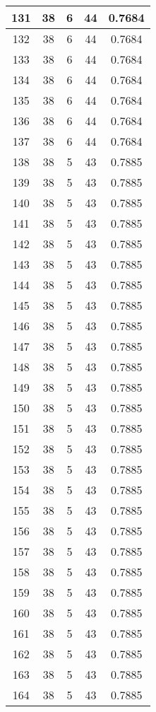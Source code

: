 \documentclass[letterpaper, 12pt]{article}
\begin{document}
\begin{longtable}{|c|c|c|c|c|}
\hline
131 & 38 & 6 & 44 & 0.7684 \\
\hline
132 & 38 & 6 & 44 & 0.7684 \\
\hline
133 & 38 & 6 & 44 & 0.7684 \\
\hline
134 & 38 & 6 & 44 & 0.7684 \\
\hline
135 & 38 & 6 & 44 & 0.7684 \\
\hline
136 & 38 & 6 & 44 & 0.7684 \\
\hline
137 & 38 & 6 & 44 & 0.7684 \\
\hline
138 & 38 & 5 & 43 & 0.7885 \\
\hline
139 & 38 & 5 & 43 & 0.7885 \\
\hline
140 & 38 & 5 & 43 & 0.7885 \\
\hline
141 & 38 & 5 & 43 & 0.7885 \\
\hline
142 & 38 & 5 & 43 & 0.7885 \\
\hline
143 & 38 & 5 & 43 & 0.7885 \\
\hline
144 & 38 & 5 & 43 & 0.7885 \\
\hline
145 & 38 & 5 & 43 & 0.7885 \\
\hline
146 & 38 & 5 & 43 & 0.7885 \\
\hline
147 & 38 & 5 & 43 & 0.7885 \\
\hline
148 & 38 & 5 & 43 & 0.7885 \\
\hline
149 & 38 & 5 & 43 & 0.7885 \\
\hline
150 & 38 & 5 & 43 & 0.7885 \\
\hline
151 & 38 & 5 & 43 & 0.7885 \\
\hline
152 & 38 & 5 & 43 & 0.7885 \\
\hline
153 & 38 & 5 & 43 & 0.7885 \\
\hline
154 & 38 & 5 & 43 & 0.7885 \\
\hline
155 & 38 & 5 & 43 & 0.7885 \\
\hline
156 & 38 & 5 & 43 & 0.7885 \\
\hline
157 & 38 & 5 & 43 & 0.7885 \\
\hline
158 & 38 & 5 & 43 & 0.7885 \\
\hline
159 & 38 & 5 & 43 & 0.7885 \\
\hline
160 & 38 & 5 & 43 & 0.7885 \\
\hline
161 & 38 & 5 & 43 & 0.7885 \\
\hline
162 & 38 & 5 & 43 & 0.7885 \\
\hline
163 & 38 & 5 & 43 & 0.7885 \\
\hline
164 & 38 & 5 & 43 & 0.7885 \\

\end{longtable}
\end{document}
